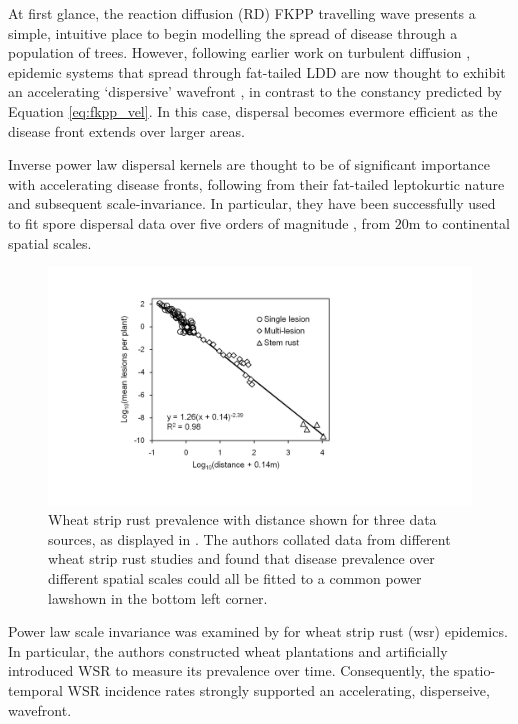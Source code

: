 At first glance, the reaction diffusion (RD) FKPP travelling wave presents a simple, 
intuitive place to begin modelling the spread of disease through a population of trees.
However, following earlier work on turbulent diffusion \cite{scherm1996velocity},
epidemic systems that spread through fat-tailed LDD are now thought to exhibit an accelerating `dispersive' 
wavefront \cite{pybus2012unifying, cowger2005velocity},
in contrast to the constancy predicted by Equation \ref{eq:fkpp_vel}. In this case,
dispersal becomes evermore efficient as the disease front extends over larger areas.

Inverse power law dispersal kernels are thought to be of significant importance with accelerating disease
fronts, following from their fat-tailed leptokurtic nature and subsequent scale-invariance. In particular,
they have been successfully used to fit spore dispersal data over five orders of magnitude \cite{mundt2009long}, 
from $20\mathrm{m}$ to continental spatial scales. 

\begin{figure}
    \centering
    \includegraphics[scale=0.3]{chapter2/figures/multi-spread.pdf}
    \caption{Wheat strip rust prevalence with distance shown for three data sources, as displayed in \cite{severns2019consequences}.
             The authors collated data from different wheat strip rust studies and found that disease prevalence 
             over different spatial scales could all be fitted to a common power law\textemdash shown in the bottom left corner. 
    }
    \label{fig:WSR-prevelance}
\end{figure}

Power law scale invariance was examined by \cite{severns2019consequences} for wheat strip rust (\acrshort{wsr}) epidemics. 
In particular, the authors constructed wheat plantations and artificially introduced WSR to measure its prevalence over time. 
Consequently, the spatio-temporal WSR incidence rates strongly supported
an accelerating, disperseive, wavefront. 

